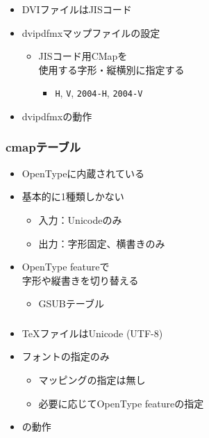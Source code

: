 \begin{frame}\frametitle{\pTeX}
  \begin{itemize}
  \item DVIファイルはJISコード
  \item dvipdfmxマップファイルの設定
    \begin{itemize}
    \item JISコード用CMapを \\
      使用する字形・縦横別に指定する
      \begin{itemize}
        \item \texttt{H}, \texttt{V}, \texttt{2004-H}, \texttt{2004-V}
      \end{itemize}
    \end{itemize}
  \item dvipdfmxの動作
    \begin{centering}
      \footnotesize
      
    \end{centering}
  \end{itemize}
\end{frame}

\begin{frame}\frametitle{cmapテーブル}
  \begin{itemize}
  \item OpenTypeに内蔵されている
  \item 基本的に1種類しかない
    \begin{itemize}
    \item 入力：Unicodeのみ
    \item 出力：字形固定、横書きのみ
    \end{itemize}
  \item OpenType featureで \\
    字形や縦書きを切り替える
    \begin{itemize}
    \item GSUBテーブル
    \end{itemize}
  \end{itemize}
\end{frame}

\begin{frame}\frametitle{\LuaTeX}
  \begin{itemize}
  \item \TeX ファイルはUnicode (UTF-8)
  \item フォントの指定のみ
    \begin{itemize}
    \item マッピングの指定は無し
    \item 必要に応じてOpenType featureの指定
    \end{itemize}
  \item \LuaTeX の動作
    \begin{centering}
      \footnotesize
      
    \end{centering}
  \end{itemize}
\end{frame}

